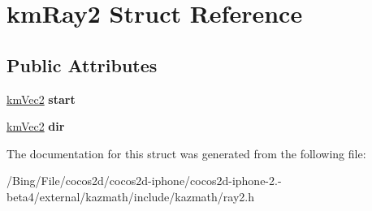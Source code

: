 \hypertarget{structkm_ray2}{\section{km\-Ray2 Struct Reference}
\label{structkm_ray2}
}
\subsection*{Public Attributes}
\begin{DoxyCompactItemize}
\item 
\hypertarget{structkm_ray2_a14cb97158ba75538b26a7128257be6d1}{\hyperlink{structkm_vec2}{km\-Vec2} {\bfseries start}}\label{structkm_ray2_a14cb97158ba75538b26a7128257be6d1}

\item 
\hypertarget{structkm_ray2_a443cababdfd0252b40a47ad4a8e325a2}{\hyperlink{structkm_vec2}{km\-Vec2} {\bfseries dir}}\label{structkm_ray2_a443cababdfd0252b40a47ad4a8e325a2}

\end{DoxyCompactItemize}


The documentation for this struct was generated from the following file\-:\begin{DoxyCompactItemize}
\item 
/\-Bing/\-File/cocos2d/cocos2d-\/iphone/cocos2d-\/iphone-\/2.-\/beta4/external/kazmath/include/kazmath/ray2.\-h\end{DoxyCompactItemize}
